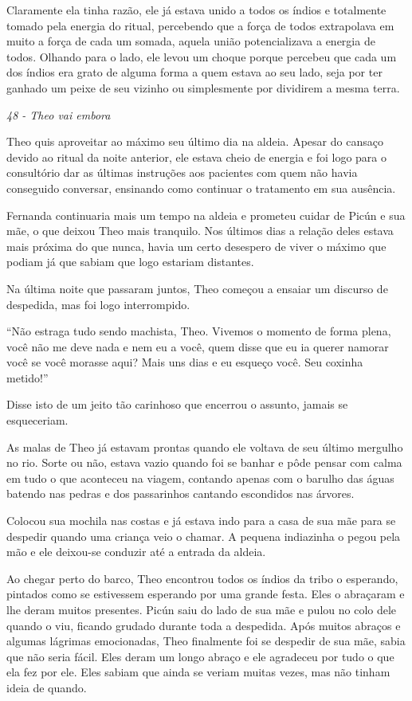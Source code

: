 Claramente ela tinha razão, ele já estava unido a todos os índios e
totalmente tomado pela energia do ritual, percebendo que a força de
todos extrapolava em muito a força de cada um somada, aquela união
potencializava a energia de todos. Olhando para o lado, ele levou um
choque porque percebeu que cada um dos índios era grato de alguma forma
a quem estava ao seu lado, seja por ter ganhado um peixe de seu vizinho
ou simplesmente por dividirem a mesma terra.

\asterisc

\emph{48 - Theo vai embora}

Theo quis aproveitar ao máximo seu último dia na aldeia. Apesar do
cansaço devido ao ritual da noite anterior, ele estava cheio de energia
e foi logo para o consultório dar as últimas instruções aos pacientes
com quem não havia conseguido conversar, ensinando como continuar o
tratamento em sua ausência.

Fernanda continuaria mais um tempo na aldeia e prometeu cuidar de Picún
e sua mãe, o que deixou Theo mais tranquilo. Nos últimos dias a relação
deles estava mais próxima do que nunca, havia um certo desespero de
viver o máximo que podiam já que sabiam que logo estariam distantes.

Na última noite que passaram juntos, Theo começou a ensaiar um discurso
de despedida, mas foi logo interrompido.

``Não estraga tudo sendo machista, Theo. Vivemos o momento de forma
plena, você não me deve nada e nem eu a você, quem disse que eu ia
querer namorar você se você morasse aqui? Mais uns dias e eu esqueço
você. Seu coxinha metido!''

Disse isto de um jeito tão carinhoso que encerrou o assunto, jamais se
esqueceriam.

As malas de Theo já estavam prontas quando ele voltava de seu último
mergulho no rio. Sorte ou não, estava vazio quando foi se banhar e pôde
pensar com calma em tudo o que aconteceu na viagem, contando apenas com
o barulho das águas batendo nas pedras e dos passarinhos cantando
escondidos nas árvores.

Colocou sua mochila nas costas e já estava indo para a casa de sua mãe
para se despedir quando uma criança veio o chamar. A pequena indiazinha
o pegou pela mão e ele deixou-se conduzir até a entrada da aldeia.

Ao chegar perto do barco, Theo encontrou todos os índios da tribo o
esperando, pintados como se estivessem esperando por uma grande festa.
Eles o abraçaram e lhe deram muitos presentes. Picún saiu do lado de sua
mãe e pulou no colo dele quando o viu, ficando grudado durante toda a
despedida. Após muitos abraços e algumas lágrimas emocionadas, Theo
finalmente foi se despedir de sua mãe, sabia que não seria fácil. Eles
deram um longo abraço e ele agradeceu por tudo o que ela fez por ele.
Eles sabiam que ainda se veriam muitas vezes, mas não tinham ideia de
quando.

